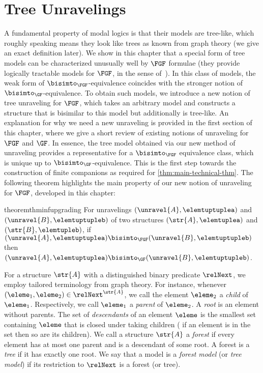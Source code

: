 \chapter{Tree Unravelings}\label{chap:unraveling}
A fundamental property of modal logics is that their models are tree-like, which roughly speaking means they look like trees as known from graph theory (we give an exact definition later).
We show in this chapter that a special form of tree models can be characterized unusually well by $\FGF$ formulae (they provide logically tractable models for $\FGF$, in the sense of~\cite{otto2013}).
In this class of models, the weak form of $\bisimto_{\FGF}$-equivalence coincides with the stronger notion of $\bisimto_{\GF}$-equivalence.
To obtain such models, we introduce a new notion of tree unraveling for $\FGF$, which takes an arbitrary model and constructs a structure that is bisimilar to this model but additionally is tree-like.
An explanation for why we need a new unraveling is provided in the first section of this chapter, where we give a short review of existing notions of unraveling for $\FGF$ and $\GF$.
In essence, the tree model obtained via our new method of unraveling provides a representative for a $\bisimto_{\FGF}$ equivalence class, which is unique up to $\bisimto_{\GF}$-equivalence.
This is the first step towards the construction of finite companions as required for \cref{thm:main-technical-thm}.
The following theorem highlights the main property of our new notion of unraveling for $\FGF$, developed in this chapter:
\begin{restatable*}{theorem}{thminfupgrading}\label{thm:inf-bisim-upgrading}
  For unravelings $(\unravel{A}, \elemtuptuplea)$ and $(\unravel{B}, \elemtuptupleb)$  of two structures $(\str{A}, \elemtuplea)$ and $(\str{B}, \elemtupleb)$, if $(\unravel{A}, \elemtuptuplea) \bisimto_{\FGF} (\unravel{B}, \elemtuptupleb)$ then $(\unravel{A}, \elemtuptuplea) \bisimto_{\GF} (\unravel{B}, \elemtuptupleb)$.
\end{restatable*}%

For a structure $\str{A}$ with a distinguished binary predicate $\relNext$, we employ tailored terminology from graph theory.
For instance, whenever $(\eleme_1, \eleme_2) \in \relNext^{\str{A}}$, we call the element $\eleme_2$ a \emph{child} of $\eleme_1$. Respectively, we call $\eleme_1$ a \emph{parent} of $\eleme_2$.
A \emph{root} is an element without parents.
The set of \emph{descendants} of an element $\eleme$ is the smallest set containing $\eleme$ that is closed under taking children (\ie{} if an element is in the set then so are its children).
We call a structure $\str{A}$ a \emph{forest} if every element has at most one parent and is a descendant of some root.
A forest is a \emph{tree} if it has exactly one root.
We say that a model is a \emph{forest model} (or \emph{tree model}) if its restriction to $\relNext$ is a forest (or tree).

